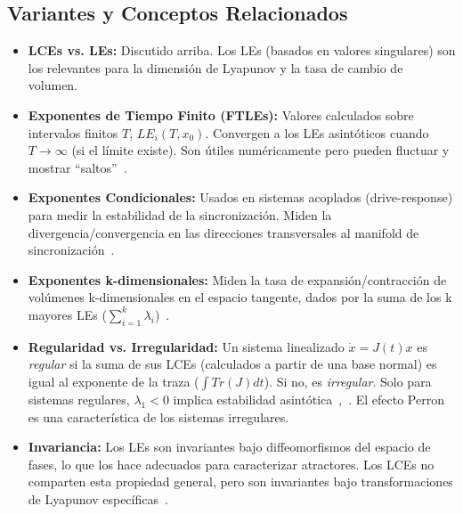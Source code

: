 \subsection{Variantes y Conceptos Relacionados}
\begin{itemize}
    \item \textbf{LCEs vs. LEs:} Discutido arriba. Los LEs (basados en valores singulares) son los relevantes para la dimensión de Lyapunov y la tasa de cambio de volumen.
    \item \textbf{Exponentes de Tiempo Finito (FTLEs):} Valores calculados sobre intervalos finitos $T$, $LE_i(T, x_0)$. Convergen a los LEs asintóticos cuando $T \to \infty$ (si el límite existe). Son útiles numéricamente pero pueden fluctuar y mostrar ``saltos''~\cite{Kuznetsov2016, Kuznetsov_2016}.
    \item \textbf{Exponentes Condicionales:} Usados en sistemas acoplados (drive-response) para medir la estabilidad de la sincronización. Miden la divergencia/convergencia en las direcciones transversales al manifold de sincronización~\cite{Pecora1997}.
    \item \textbf{Exponentes k-dimensionales:} Miden la tasa de expansión/contracción de volúmenes k-dimensionales en el espacio tangente, dados por la suma de los k mayores LEs ($\sum_{i=1}^k \lambda_i$)~\cite{Shimada1979}.
    \item \textbf{Regularidad vs. Irregularidad:} Un sistema linealizado $\dot{x} = J(t)x$ es \textit{regular} si la suma de sus LCEs (calculados a partir de una base normal) es igual al exponente de la traza ($\int Tr(J) dt$). Si no, es \textit{irregular}. Solo para sistemas regulares, $\lambda_1 < 0$ implica estabilidad asintótica~\cite{Leonov2007},~\cite{Kuznetsov2016}. El efecto Perron es una característica de los sistemas irregulares.
    \item \textbf{Invariancia:} Los LEs son invariantes bajo diffeomorfismos del espacio de fases, lo que los hace adecuados para caracterizar atractores. Los LCEs no comparten esta propiedad general, pero son invariantes bajo transformaciones de Lyapunov específicas~\cite{Kuznetsov2016}.
\end{itemize}

